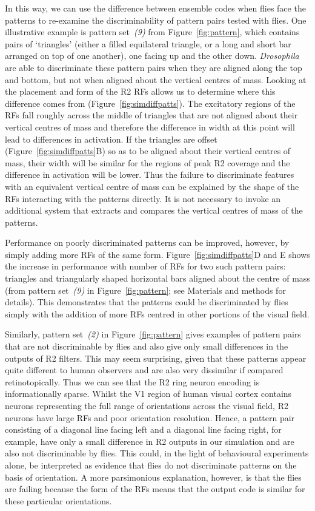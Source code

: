 In this way, we can use the difference between ensemble codes when flies face the patterns to re-examine the discriminability of pattern pairs tested with flies. One illustrative example is pattern set~\emph{(9)} from Figure~\ref{fig:pattern}, which contains pairs of ‘triangles’ (either a filled equilateral triangle, or a long and short bar arranged on top of one another), one facing up and the other down. \emph{Drosophila} are able to discriminate these pattern pairs when they are aligned along the top and bottom, but not when aligned about the vertical centres of mass\cite{Ernst1999}. Looking at the placement and form of the R2 RFs allows us to determine where this difference comes from (Figure~\ref{fig:simdiffpatts}). The excitatory regions of the RFs fall roughly across the middle of triangles that are not aligned about their vertical centres of mass and therefore the difference in width at this point will lead to differences in activation. If the triangles are offset (Figure~\ref{fig:simdiffpatts}B) so as to be aligned about their vertical centres of mass, their width will be similar for the regions of peak R2 coverage and the difference in activation will be lower. Thus the failure to discriminate features with an equivalent vertical centre of mass can be explained by the shape of the RFs interacting with the patterns directly. It is not necessary to invoke an additional system that extracts and compares the vertical centres of mass of the patterns.

Performance on poorly discriminated patterns can be improved, however, by simply adding more RFs of the same form. Figure~\ref{fig:simdiffpatts}D and E shows the increase in performance with number of RFs for two such pattern pairs: triangles and triangularly shaped horizontal bars aligned about the centre of mass (from pattern set~\emph{(9)} in Figure~\ref{fig:pattern}; see Materials and methods for details). This demonstrates that the patterns could be discriminated by flies simply with the addition of more RFs centred in other portions of the visual field.

Similarly, pattern set~\emph{(2)} in Figure~\ref{fig:pattern} gives examples of pattern pairs that are not discriminable by flies and also give only small differences in the outputs of R2 filters. This may seem surprising, given that these patterns appear quite different to human observers and are also very dissimilar if compared retinotopically. Thus we can see that the R2 ring neuron encoding is informationally sparse. Whilst the V1 region of human visual cortex contains neurons representing the full range of orientations across the visual field, R2 neurons have large RFs and poor orientation resolution. Hence, a pattern pair consisting of a diagonal line facing left and a diagonal line facing right, for example, have only a small difference in R2 outputs in our simulation and are also not discriminable by flies. This could, in the light of behavioural experiments alone, be interpreted as evidence that flies do not discriminate patterns on the basis of orientation. A more parsimonious explanation, however, is that the flies are failing because the form of the RFs means that the output code is similar for these particular orientations.

